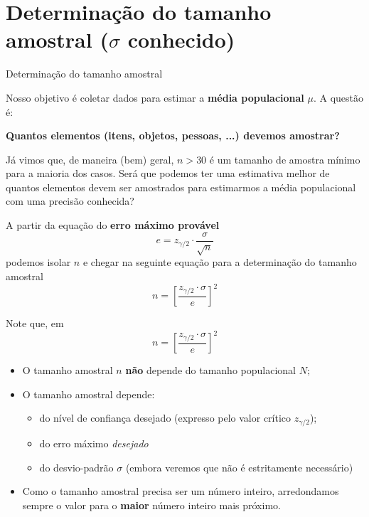 \documentclass[14pt,aspectratio=1610]{beamer}
\begin{document}
\section{Determinação do tamanho amostral ($\sigma$ conhecido)}
\begin{frame}{Determinação do tamanho amostral}
    \begin{block}{}
    \justifying
Nosso objetivo é coletar dados para estimar a \textbf{média populacional} $\mu$. A questão é:
\begin{center}
\textbf{Quantos elementos (itens, objetos, pessoas, ...) devemos amostrar?}   
\end{center}

Já vimos que, de maneira (bem) geral, $n>30$ é um tamanho de amostra mínimo para a maioria dos casos. Será que podemos ter uma estimativa melhor de quantos elementos devem ser amostrados para estimarmos a média populacional com uma precisão conhecida?   
\end{block}
\end{frame}

\begin{frame}{}
    \begin{block}{}
    \justifying
A partir da equação do \textbf{erro máximo provável}
$$
e = z_{\gamma/2} \cdot \frac{\sigma}{\sqrt{n}}
$$ 
podemos isolar $n$ e chegar na seguinte equação para a determinação do tamanho amostral
$$
n = \left[ \frac{z_{\gamma/2} \cdot \sigma}{e} \right]^2
$$
\end{block}
\end{frame}

\begin{frame}{}
    \begin{block}{}
    \justifying
Note que, em
$$
n = \left[ \frac{z_{\gamma/2} \cdot \sigma}{e} \right]^2
$$
\begin{itemize}
    \item O tamanho amostral $n$ \textbf{não} depende do tamanho populacional $N;$
    \item O tamanho amostral depende:
    \begin{itemize}
        \item do nível de confiança desejado (expresso pelo valor crítico $z_{\gamma/2}$);
        \item do erro máximo \textsl{desejado}
        \item do desvio-padrão $\sigma$ (embora veremos que não é estritamente necessário)
    \end{itemize}
    \item Como o tamanho amostral precisa ser um número inteiro, arredondamos sempre o valor para o \textbf{maior} número inteiro mais próximo.
\end{itemize}
\end{block}
\end{frame}
\end{document}
